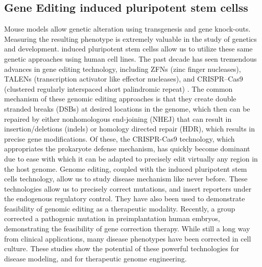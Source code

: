 \documentclass[sigconf]{acmart}
\begin{document}
\subsection{Gene Editing  induced pluripotent stem cellss}
Mouse models allow genetic alteration using transgenesis and gene knock-outs.
Measuring the resulting phenotype is extremely valuable in the study of genetics and
development.  induced pluripotent stem cellss allow us to utilize these same genetic approaches using human cell lines.
The past decade has seen tremendous advances in gene editing technology, including ZFNs (zinc
finger nucleases), TALENs (transcription activator like effector nucleases), and CRISPR–Cas9
(clustered regularly interspaced short palindromic repeat) \cite{smith2014whole} \cite{hockemeyer2009efficient}. The common mechanism of
these genomic editing approaches is that they create double stranded breaks (DSBs) at desired
locations in the genome, which then can be repaired by either nonhomologous end-joining
(NHEJ) that can result in insertion/deletions (indels) or homology directed repair (HDR), which
results in precise gene modifications. Of these, the CRISPR-Cas9 technology, which
appropriates the prokaryote defense mechanism, has quickly become dominant due to ease with
which it can be adapted to precisely edit virtually any region in the host genome. 
Genome editing, coupled with the  induced pluripotent stem cells technology, allow us to study disease mechanism like never before. These technologies allow us to precisely correct mutations, and insert reporters under the endogenous regulatory control. They have also been used to demonstrate feasibility of genomic editing as a therapeutic modality. Recently, a group corrected a pathogenic mutation in preimplantation human embryos, demonstrating the feasibility of gene correction therapy. While still a long way from clinical applications, many disease phenotypes have been corrected in cell culture. These studies show the potential of these powerful technologies for disease modeling, and for therapeutic genome engineering.
\end{document}
